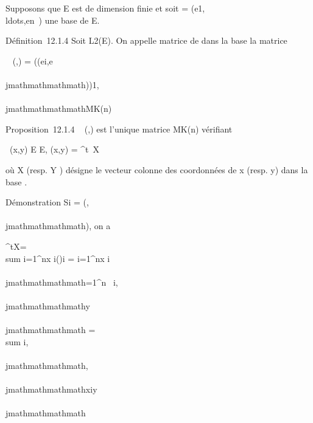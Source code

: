 Supposons que E est de dimension finie et soit  =
(e1,\\ldots,en~)
une base de E.

Définition~12.1.4 Soit \phi \in L2(E). On appelle matrice de \phi dans
la base  la matrice

\mathrmMat~ (\phi,) =
(\phi(ei,e\\\\jmathmathmathmath))1\leqi,\\\\jmathmathmathmath\leqn \in MK(n)

Proposition~12.1.4
\mathrmMat~ (\phi,) est
l'unique matrice \Omega \in MK(n) vérifiant

\forall~(x,y) \in E \times E, \phi(x,y) = ^t~X\OmegaY

où X (resp. Y ) désigne le vecteur colonne des coordonnées de x (resp.
y) dans la base .

Démonstration Si \Omega = (\omegai,\\\\jmathmathmathmath), on a

 ^tX\OmegaY = \\sum
i=1^nx i(\OmegaY )i =
\sum i=1^nx i~
\sum \\\\jmathmathmathmath=1^n\omega~
i,\\\\jmathmathmathmathy\\\\jmathmathmathmath = \\sum
i,\\\\jmathmathmathmath\omegai,\\\\jmathmathmathmathxiy\\\\jmathmathmathmath

